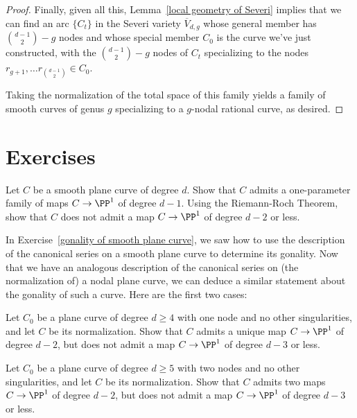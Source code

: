 \begin{proof}
Finally, given all this, Lemma~\ref{local geometry of Severi} implies that we can find an arc $\{C_t\}$ in the Severi variety $\overline V_{d,g}$ whose general member has $\binom{d-1}{2} - g$ nodes and whose special member $C_0$ is the curve we've just constructed, with the $\binom{d-1}{2} - g$ nodes of $C_t$ specializing to the nodes $r_{g+1}, \dots r_{\binom{d-1}{2}} \in C_0$.

 Taking the normalization of the total space of this family yields a family of smooth curves of genus $g$ specializing to a $g$-nodal rational curve, as desired. 
 
\end{proof}

\section{Exercises}
\begin{exercise}\label{gonality of smooth plane curve}
Let $C$ be a smooth plane curve of degree $d$. Show that $C$ admits a one-parameter family of maps $C \to \PP^1$ of degree $d-1$. Using the Riemann-Roch Theorem, show that $C$ does not admit a map $C \to \PP^1$ of degree $d-2$ or less.
\end{exercise}

In Exercise~\ref{gonality of smooth plane curve}, we saw how to use the description of the canonical series on a smooth plane curve to determine its gonality. Now that we have an analogous description of the canonical series on (the normalization of) a nodal plane curve, we can deduce a similar statement about the gonality of such a curve. Here are the first two cases: 

\begin{exercise}
Let $C_0$ be a plane curve of degree $d\geq 4$ with one node and no other singularities, and let $C$ be its normalization. Show that $C$ admits a unique map $C \to \PP^1$ of degree $d-2$, but does not admit a map $C \to \PP^1$ of degree $d-3$ or less.
\end{exercise}

\begin{exercise}
Let $C_0$ be a plane curve of degree $d\geq 5$ with two nodes and no other singularities, and let $C$ be its normalization. Show that $C$ admits two maps $C \to \PP^1$ of degree $d-2$, but does not admit a map $C \to \PP^1$ of degree $d-3$ or less.
\end{exercise}

